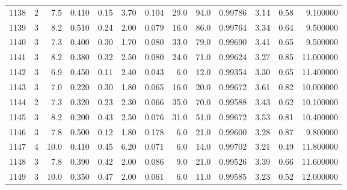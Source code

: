 \begin{tabular}{lrrrrrrrrrrrr}
1138 &        2 &            7.5 &             0.410 &         0.15 &            3.70 &      0.104 &                 29.0 &                  94.0 &  0.99786 &  3.14 &       0.58 &   9.100000 \\
1139 &        3 &            8.2 &             0.510 &         0.24 &            2.00 &      0.079 &                 16.0 &                  86.0 &  0.99764 &  3.34 &       0.64 &   9.500000 \\
1140 &        3 &            7.3 &             0.400 &         0.30 &            1.70 &      0.080 &                 33.0 &                  79.0 &  0.99690 &  3.41 &       0.65 &   9.500000 \\
1141 &        3 &            8.2 &             0.380 &         0.32 &            2.50 &      0.080 &                 24.0 &                  71.0 &  0.99624 &  3.27 &       0.85 &  11.000000 \\
1142 &        3 &            6.9 &             0.450 &         0.11 &            2.40 &      0.043 &                  6.0 &                  12.0 &  0.99354 &  3.30 &       0.65 &  11.400000 \\
1143 &        3 &            7.0 &             0.220 &         0.30 &            1.80 &      0.065 &                 16.0 &                  20.0 &  0.99672 &  3.61 &       0.82 &  10.000000 \\
1144 &        2 &            7.3 &             0.320 &         0.23 &            2.30 &      0.066 &                 35.0 &                  70.0 &  0.99588 &  3.43 &       0.62 &  10.100000 \\
1145 &        3 &            8.2 &             0.200 &         0.43 &            2.50 &      0.076 &                 31.0 &                  51.0 &  0.99672 &  3.53 &       0.81 &  10.400000 \\
1146 &        3 &            7.8 &             0.500 &         0.12 &            1.80 &      0.178 &                  6.0 &                  21.0 &  0.99600 &  3.28 &       0.87 &   9.800000 \\
1147 &        4 &           10.0 &             0.410 &         0.45 &            6.20 &      0.071 &                  6.0 &                  14.0 &  0.99702 &  3.21 &       0.49 &  11.800000 \\
1148 &        3 &            7.8 &             0.390 &         0.42 &            2.00 &      0.086 &                  9.0 &                  21.0 &  0.99526 &  3.39 &       0.66 &  11.600000 \\
1149 &        3 &           10.0 &             0.350 &         0.47 &            2.00 &      0.061 &                  6.0 &                  11.0 &  0.99585 &  3.23 &       0.52 &  12.000000 \\

\end{tabular}
